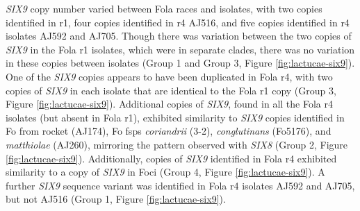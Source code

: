 \textit{SIX9} copy number varied between \ac{Fola} races and isolates, with two copies identified in \ac{r1}, four copies identified in \ac{r4} AJ516, and five copies identified in \ac{r4} isolates AJ592 and AJ705. Though there was variation between the two copies of \textit{SIX9} in the \ac{Fola} \ac{r1} isolates, which were in separate clades, there was no variation in these copies between isolates (Group 1 and Group 3, Figure \ref{fig:lactucae-six9}). One of the \textit{SIX9} copies appears to have been duplicated in \ac{Fola} \ac{r4}, with two copies of \textit{SIX9} in each isolate that are identical to the \ac{Fola} \ac{r1} copy (Group 3, Figure \ref{fig:lactucae-six9}). Additional copies of \textit{SIX9}, found in all the \ac{Fola} \ac{r4} isolates (but absent in \ac{Fola} \ac{r1}), exhibited similarity to \textit{SIX9} copies identified in \ac{Fo} from rocket (AJ174), \ac{Fo} \acp{fsp} \textit{coriandrii} (3-2), \textit{conglutinans} (Fo5176), and \textit{matthiolae} (AJ260), mirroring the pattern observed with \textit{SIX8} (Group 2, Figure \ref{fig:lactucae-six9}). Additionally, copies of \textit{SIX9} identified in \ac{Fola} \ac{r4} exhibited similarity to a copy of \textit{SIX9} in \ac{Foci} (Group 4, Figure \ref{fig:lactucae-six9}). A further \textit{SIX9} sequence variant was identified in \ac{Fola} \ac{r4} isolates AJ592 and AJ705, but not AJ516 (Group 1, Figure \ref{fig:lactucae-six9}). 

